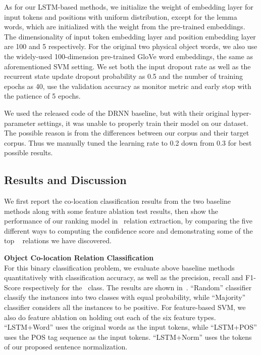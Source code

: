 As for our LSTM-based methods, we initialize the weight of embedding 
layer for input tokens and positions with uniform distribution, 
except for the lemma words, which are initialized with the weight from 
the pre-trained embeddings. The dimensionality of input token embedding layer and position embedding layer are 100 and 5 respectively. For the original two physical object words, we also use the widely-used 100-dimension pre-trained GloVe word embeddings, the same as aforementioned SVM setting. 
We set both the input dropout rate as well as the recurrent state update dropout probability as 0.5 and the number of training epochs as 40, use the validation accuracy as monitor metric and early stop with the patience of 5 epochs.

We used the released code of the DRNN baseline, 
but with their original hyper-parameter settings, 
it was unable to properly train their model on our dataset. 
The possible reason is from the differences between our corpus and 
their target corpus. 
Thus we manually tuned the learning rate to 0.2 down from 0.3 for 
best possible results.

\subsection{Results and Discussion}
We first report the co-location classification results from the two baseline
methods along with some feature ablation test results, then show the
performance of our ranking model in \lnear\ relation extraction, by comparing
the five different ways to computing the confidence score and demonstrating
some of the top \lnear~ relations we have discovered.

\noindent
\textbf{Object Co-location Relation Classification}\\
For this binary classification problem, we evaluate above baseline methods  
quantitatively with classification accuracy, as well as the
precision, recall and F1-Score respectively for the \lnear\ class.
The results are shown in~.
``Random'' classifier classify the instances into two classes with equal probability, while ``Majority'' classifier considers all the instances to be positive.
For feature-based SVM, we also do feature ablation on holding out each of the six feature types. 
``LSTM+Word'' uses the original words as the input tokens, while ``LSTM+POS'' uses the POS tag sequence as the input tokens. ``LSTM+Norm'' uses the tokens of our proposed sentence normalization. 

